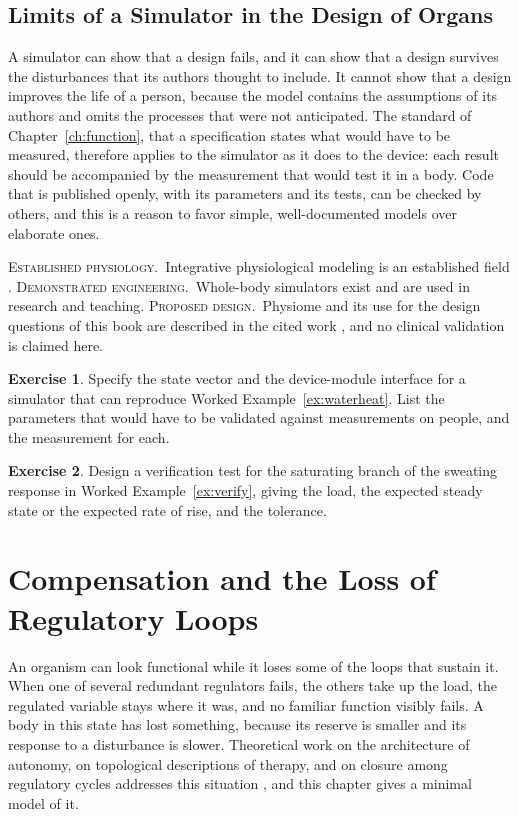 \documentclass[11pt,openany]{book}
\theoremstyle{definition}
\newtheorem{exercise}{Exercise}[chapter]
\theoremstyle{remark}
\newcommand{\est}{\textsc{Established physiology.}\ }
\newcommand{\dem}{\textsc{Demonstrated engineering.}\ }
\newcommand{\pro}{\textsc{Proposed design.}\ }
\begin{document}
\section{Limits of a Simulator in the Design of Organs}

A simulator can show that a design fails, and it can show that a design survives the disturbances that its authors thought to include. It cannot show that a design improves the life of a person, because the model contains the assumptions of its authors and omits the processes that were not anticipated. The standard of Chapter~\ref{ch:function}, that a specification states what would have to be measured, therefore applies to the simulator as it does to the device: each result should be accompanied by the measurement that would test it in a body. Code that is published openly, with its parameters and its tests, can be checked by others, and this is a reason to favor simple, well-documented models over elaborate ones.

\begin{evidence}
\est Integrative physiological modeling is an established field \cite{guyton1972,hester2011}. \dem Whole-body simulators exist and are used in research and teaching. \pro Physiome and its use for the design questions of this book are described in the cited work \cite{flyxion2026physiome,flyxion2026rtl}, and no clinical validation is claimed here.
\end{evidence}

\begin{exercise}
Specify the state vector and the device-module interface for a simulator that can reproduce Worked Example~\ref{ex:waterheat}. List the parameters that would have to be validated against measurements on people, and the measurement for each.
\end{exercise}

\begin{exercise}
Design a verification test for the saturating branch of the sweating response in Worked Example~\ref{ex:verify}, giving the load, the expected steady state or the expected rate of rise, and the tolerance.
\end{exercise}

\chapter{Compensation and the Loss of Regulatory Loops}
\label{ch:compensation}

An organism can look functional while it loses some of the loops that sustain it. When one of several redundant regulators fails, the others take up the load, the regulated variable stays where it was, and no familiar function visibly fails. A body in this state has lost something, because its reserve is smaller and its response to a disturbance is slower. Theoretical work on the architecture of autonomy, on topological descriptions of therapy, and on closure among regulatory cycles addresses this situation \cite{flyxion2026autonomy,flyxion2026topther,flyxion2026closure}, and this chapter gives a minimal model of it.
\end{document}
